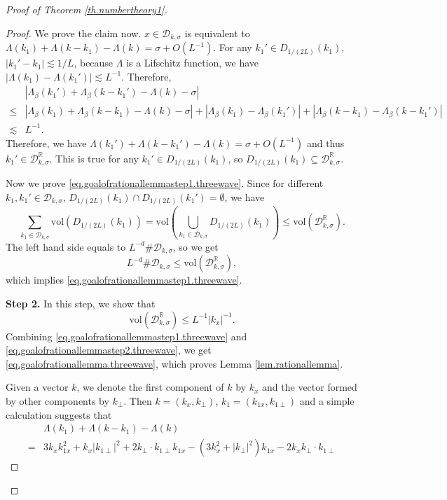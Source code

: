 \begin{proof}[Proof of Theorem \ref{th.numbertheory1}]
\begin{proof}
We prove the claim now. $x\in \mathcal{D}_{k,\sigma}$ is equivalent to $\Lambda(k_1)+\Lambda(k-k_1)-\Lambda(k)=\sigma+O(L^{-1})$. For any $k_1'\in D_{1/(2L)}(k_1)$, $|k_1'-k_1|\lesssim 1/L$, because $\Lambda$ is a Lifschitz function, we have $|\Lambda(k_1)-\Lambda(k_1')|\lesssim L^{-1}$. Therefore, 
\begin{equation}
\begin{split}
    &|\Lambda_{\beta}(k_1')+\Lambda_{\beta}(k-k_1')-\Lambda(k)-\sigma|
    \\
    \le &|\Lambda_{\beta}(k_1)+\Lambda_{\beta}(k-k_1)-\Lambda(k)-\sigma|+|\Lambda_{\beta}(k_1)-\Lambda_{\beta}(k_1')|+|\Lambda_{\beta}(k-k_1)-\Lambda_{\beta}(k-k_1')|
    \\
    \lesssim & L^{-1}.
\end{split}
\end{equation}
Therefore, we have $\Lambda(k_1')+\Lambda(k-k_1')-\Lambda(k)=\sigma+O(L^{-1})$ and thus $k_1'\in \mathcal{D}^{\mathbb{R}}_{k,\sigma}$. This is true for any $k_1'\in D_{1/(2L)}(k_1)$, so $D_{1/(2L)}(k_1)\subseteq \mathcal{D}^{\mathbb{R}}_{k,\sigma}$.

Now we prove \eqref{eq.goalofrationallemmastep1.threewave}. Since for different $k_1,k_1'\in \mathcal{D}_{k,\sigma}$, $D_{1/(2L)}(k_1)\cap D_{1/(2L)}(k_1')=\emptyset$, we have 
\begin{equation}
    \sum_{k_1\in \mathcal{D}_{k,\sigma}} \text{vol}( D_{1/(2L)}(k_1))=\text{vol}\left( \bigcup_{k_1\in \mathcal{D}_{k,\sigma}} D_{1/(2L)}(k_1)\right)\le \text{vol}(\mathcal{D}^{\mathbb{R}}_{k,\sigma}).
\end{equation}
The left hand side equals to $L^{-d}\#\mathcal{D}_{k,\sigma}$, so we get
\begin{equation}
    L^{-d}\#\mathcal{D}_{k,\sigma}\le \text{vol}(\mathcal{D}^{\mathbb{R}}_{k,\sigma}),
\end{equation}
which implies \eqref{eq.goalofrationallemmastep1.threewave}.

\textbf{Step 2.} In this step, we show that 
\begin{equation}\label{eq.goalofrationallemmastep2.threewave}
    \text{vol}(\mathcal{D}^{\mathbb{R}}_{k,\sigma})\le L^{-1} |k_x|^{-1}.
\end{equation}
Combining \eqref{eq.goalofrationallemmastep1.threewave} and \eqref{eq.goalofrationallemmastep2.threewave}, we get
\eqref{eq.goalofrationallemma.threewave}, which proves Lemma \ref{lem.rationallemma}.

Given a vector $k$, we denote the first component of $k$ by $k_x$ and the vector formed by other components by $k_{\perp}$. Then $k=(k_x, k_{\perp})$, $k_1=(k_{1x}, k_{1\perp})$ and a simple calculation suggests that
\begin{equation}\label{eq.A11.threewave}
\begin{split}
    &\Lambda(k_1)+\Lambda(k-k_1)-\Lambda(k)
 \\
 =&3k_xk_{1x}^2+k_x|k_{1\perp}|^2+2k_{\perp}\cdot k_{1\perp}k_{1x}-(3k_x^2+|k_{\perp}|^2)k_{1x}-2k_x k_{\perp}\cdot k_{1\perp}
\end{split}
\end{equation}


\end{proof}
\end{proof}
